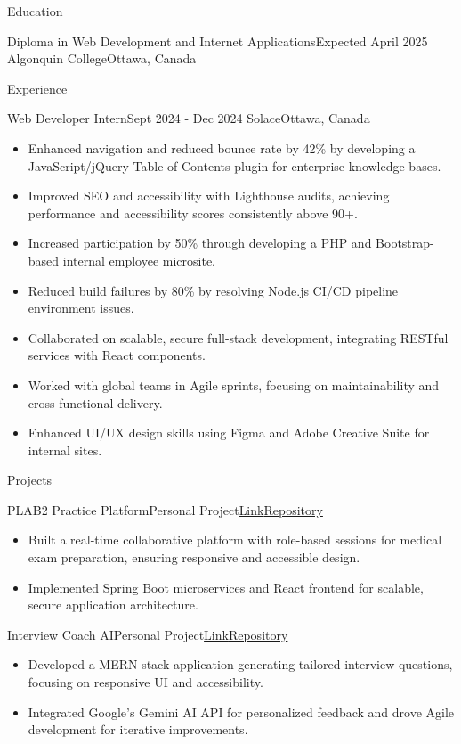 \documentclass[letterpaper, 10pt]{article}
\newcommand{\resumeItem}[1]{
  \item\small{
    {#1 \vspace{-2pt}}
  }
}
\newcommand{\resumeItemListStart}{\begin{itemize}[leftmargin=0.25cm, label={}]}
\newcommand{\resumeItemListEnd}{\end{itemize}}
\begin{document}
\begin{rSection}{Education}
\begin{rSubheading}[1.15cm]
{Diploma in Web Development and Internet Applications}{Expected April 2025}
{Algonquin College}{Ottawa, Canada}
\end{rSubheading}
\end{rSection}

\begin{rSection}{Experience}
\begin{rSubheading}[1.15cm]
{Web Developer Intern}{Sept 2024 - Dec 2024}
{Solace}{Ottawa, Canada}
\resumeItemListStart
\resumeItem{Enhanced navigation and reduced bounce rate by 42\% by developing a JavaScript/jQuery Table of Contents plugin for enterprise knowledge bases.}
\resumeItem{Improved SEO and accessibility with Lighthouse audits, achieving performance and accessibility scores consistently above 90+.}
\resumeItem{Increased participation by 50\% through developing a PHP and Bootstrap-based internal employee microsite.}
\resumeItem{Reduced build failures by 80\% by resolving Node.js CI/CD pipeline environment issues.}
\resumeItem{Collaborated on scalable, secure full-stack development, integrating RESTful services with React components.}
\resumeItem{Worked with global teams in Agile sprints, focusing on maintainability and cross-functional delivery.}
\resumeItem{Enhanced UI/UX design skills using Figma and Adobe Creative Suite for internal sites.}
\resumeItemListEnd
\end{rSubheading}
\end{rSection}

\begin{rSection}{Projects}
\begin{rSubheading}[1.15cm]
{PLAB2 Practice Platform}{Personal Project}{\href{https://plab2practice.com}{Link}}{\href{https://github.com/altansaid/plab2projectnew}{Repository}}
\resumeItemListStart
\resumeItem{Built a real-time collaborative platform with role-based sessions for medical exam preparation, ensuring responsive and accessible design.}
\resumeItem{Implemented Spring Boot microservices and React frontend for scalable, secure application architecture.}
\resumeItemListEnd
\end{rSubheading}

\begin{rSubheading}[1.15cm]
{Interview Coach AI}{Personal Project}{\href{https://interviewcoach-ai.vercel.app/}{Link}}{\href{https://github.com/altansaid/interviewcoach-ai}{Repository}}
\resumeItemListStart
\resumeItem{Developed a MERN stack application generating tailored interview questions, focusing on responsive UI and accessibility.}
\resumeItem{Integrated Google’s Gemini AI API for personalized feedback and drove Agile development for iterative improvements.}
\resumeItemListEnd
\end{rSubheading}
\end{rSection}
\end{document}
